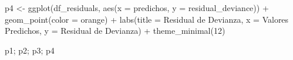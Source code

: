\documentclass[
  letterpaper,
  DIV=11,
  numbers=noendperiod]{scrartcl}
\newenvironment{Shaded}{\begin{snugshade}}{\end{snugshade}}
\newcommand{\AttributeTok}[1]{\textcolor[rgb]{0.40,0.45,0.13}{#1}}
\newcommand{\DecValTok}[1]{\textcolor[rgb]{0.68,0.00,0.00}{#1}}
\newcommand{\FunctionTok}[1]{\textcolor[rgb]{0.28,0.35,0.67}{#1}}
\newcommand{\NormalTok}[1]{\textcolor[rgb]{0.00,0.23,0.31}{#1}}
\newcommand{\OtherTok}[1]{\textcolor[rgb]{0.00,0.23,0.31}{#1}}
\newcommand{\SpecialCharTok}[1]{\textcolor[rgb]{0.37,0.37,0.37}{#1}}
\newcommand{\StringTok}[1]{\textcolor[rgb]{0.13,0.47,0.30}{#1}}
\begin{document}
\begin{Shaded}
\begin{Highlighting}[]
\NormalTok{p4 }\OtherTok{\textless{}{-}} \FunctionTok{ggplot}\NormalTok{(df\_residuals, }\FunctionTok{aes}\NormalTok{(}\AttributeTok{x =}\NormalTok{ predichos, }\AttributeTok{y =}\NormalTok{ residual\_deviance)) }\SpecialCharTok{+}
    \FunctionTok{geom\_point}\NormalTok{(}\AttributeTok{color =} \StringTok{\textquotesingle{}orange\textquotesingle{}}\NormalTok{) }\SpecialCharTok{+}
    \FunctionTok{labs}\NormalTok{(}\AttributeTok{title =} \StringTok{\textquotesingle{}Residual de Devianza\textquotesingle{}}\NormalTok{, }\AttributeTok{x =} \StringTok{\textquotesingle{}Valores Predichos\textquotesingle{}}\NormalTok{, }\AttributeTok{y =} \StringTok{\textquotesingle{}Residual de Devianza\textquotesingle{}}\NormalTok{) }\SpecialCharTok{+}
    \FunctionTok{theme\_minimal}\NormalTok{(}\DecValTok{12}\NormalTok{)}
\end{Highlighting}
\end{Shaded}

\begin{Shaded}
\begin{Highlighting}[]
\NormalTok{p1; p2; p3; p4}
\end{Highlighting}
\end{Shaded}
\end{document}
